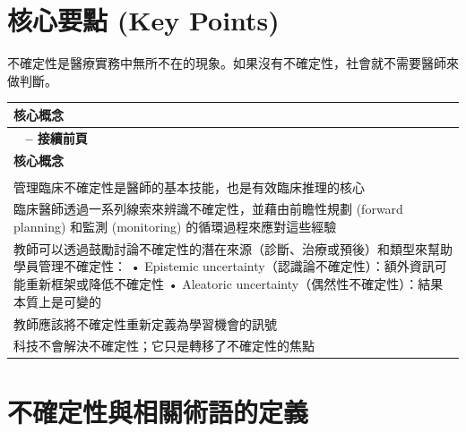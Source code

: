 \documentclass[12pt,a4paper]{article}
\newcommand{\note}[1]{
    \par
    \noindent
    \begin{tcolorbox}[
        colback=emergency_blue!5!white,
        colframe=emergency_blue,
        title=\textbf{重點提醒},
        fonttitle=\bfseries,
        boxrule=0.5pt,
        arc=3pt,
        left=6pt,
        right=6pt,
        top=6pt,
        bottom=6pt
    ]
    #1
    \end{tcolorbox}
}
\begin{document}
\section{核心要點 (Key Points)}

\note{不確定性是醫療實務中無所不在的現象。如果沒有不確定性，社會就不需要醫師來做判斷。}

\begin{longtable}{>{\raggedright\arraybackslash}p{15cm}}
\toprule
\textbf{\textcolor{emergency_blue}{核心概念}} \\
\midrule
\endfirsthead

\multicolumn{1}{c}%
{{\bfseries \tablename\ \thetable{} -- 接續前頁}} \\
\toprule
\textbf{\textcolor{emergency_blue}{核心概念}} \\
\midrule
\endhead

\midrule \multicolumn{1}{r}{{接續下頁}} \\ \midrule
\endfoot

\bottomrule
\endlastfoot

管理臨床不確定性是醫師的基本技能，也是有效臨床推理的核心 \\

臨床醫師透過一系列線索來辨識不確定性，並藉由前瞻性規劃 (forward planning) 和監測 (monitoring) 的循環過程來應對這些經驗 \\

教師可以透過鼓勵討論不確定性的潛在來源（診斷、治療或預後）和類型來幫助學員管理不確定性： \newline • Epistemic uncertainty（認識論不確定性）：額外資訊可能重新框架或降低不確定性 \newline • Aleatoric uncertainty（偶然性不確定性）：結果本質上是可變的 \\

教師應該將不確定性重新定義為學習機會的訊號 \\

科技不會解決不確定性；它只是轉移了不確定性的焦點 \\
\end{longtable}

\section{不確定性與相關術語的定義}
\end{document}
